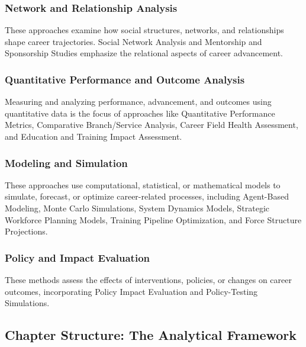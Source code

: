 \documentclass[./main.tex]{subfiles}
\begin{document}
\subsubsection{Network and Relationship
Analysis}\label{network-and-relationship-analysis}

These approaches examine how social structures, networks, and
relationships shape career trajectories. Social Network Analysis and
Mentorship and Sponsorship Studies emphasize the relational aspects of
career advancement.

\subsubsection{Quantitative Performance and Outcome
Analysis}\label{quantitative-performance-and-outcome-analysis}

Measuring and analyzing performance, advancement, and outcomes using
quantitative data is the focus of approaches like Quantitative
Performance Metrics, Comparative Branch/Service Analysis, Career Field
Health Assessment, and Education and Training Impact Assessment.

\subsubsection{Modeling and Simulation}\label{modeling-and-simulation}

These approaches use computational, statistical, or mathematical models
to simulate, forecast, or optimize career-related processes, including
Agent-Based Modeling, Monte Carlo Simulations, System Dynamics Models,
Strategic Workforce Planning Models, Training Pipeline Optimization, and
Force Structure Projections.

\subsubsection{Policy and Impact Evaluation}\label{policy-and-impact-evaluation}

These methods assess the effects of interventions, policies, or changes
on career outcomes, incorporating Policy Impact Evaluation and
Policy-Testing Simulations.

\subsection{Chapter Structure: The Analytical Framework}\label{chapter-structure-the-analytical-framework}
\end{document}
